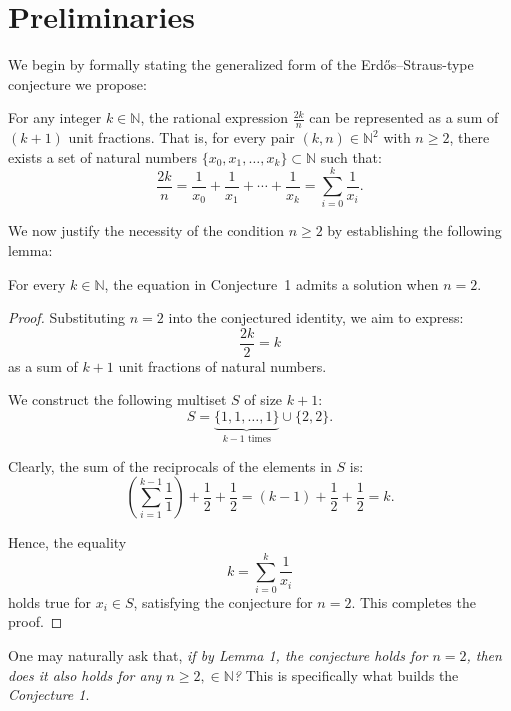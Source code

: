 \section{Preliminaries}

We begin by formally stating the generalized form of the Erdős–Straus-type conjecture we propose:

\begin{conjecture}
For any integer $k \in \mathbb{N}$, the rational expression $\frac{2k}{n}$ can be represented as a sum of $(k+1)$ unit fractions. That is, for every pair $(k, n) \in \mathbb{N}^2$ with $n \geq 2$, there exists a set of natural numbers $\{ x_0, x_1, \dots, x_k \} \subset \mathbb{N}$ such that:
\[
\frac{2k}{n} = \frac{1}{x_0} + \frac{1}{x_1} + \cdots + \frac{1}{x_k} = \sum_{i=0}^{k} \frac{1}{x_i}.
\]
\end{conjecture}

We now justify the necessity of the condition $n \geq 2$ by establishing the following lemma:

\begin{lemma}
For every $k \in \mathbb{N}$, the equation in Conjecture~1 admits a solution when $n = 2$.
\end{lemma}

\begin{proof}
Substituting $n = 2$ into the conjectured identity, we aim to express:
\[
\frac{2k}{2} = k
\]
as a sum of $k+1$ unit fractions of natural numbers.

We construct the following multiset $S$ of size $k+1$:
\[
S = \underbrace{\{ 1, 1, \dots, 1 \}}_{k-1\text{ times}} \cup \{ 2, 2 \}.
\]

Clearly, the sum of the reciprocals of the elements in $S$ is:
\[
\left( \sum_{i=1}^{k-1} \frac{1}{1} \right) + \frac{1}{2} + \frac{1}{2} = (k-1) + \frac{1}{2} + \frac{1}{2} = k.
\]

Hence, the equality
\[
k = \sum_{i=0}^{k} \frac{1}{x_i}
\]
holds true for $x_i \in S$, satisfying the conjecture for $n = 2$. This completes the proof.
\end{proof}

One may naturally ask that, \emph{if by Lemma 1, the conjecture holds for $n=2$, then does it also holds for any $n \geq 2, \in \mathbb{N}$?}
This is specifically what builds the \emph{Conjecture 1}.
